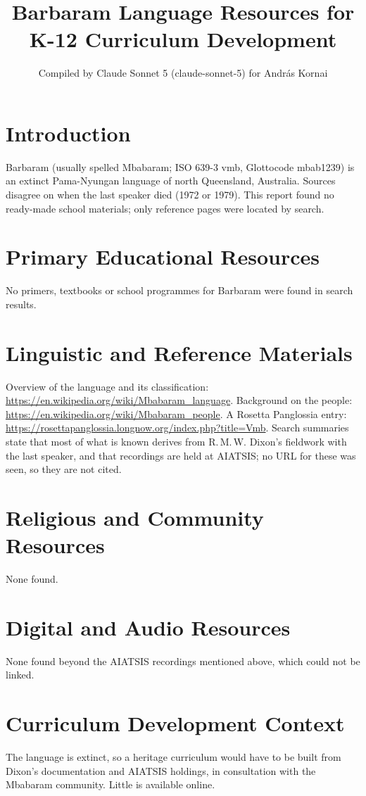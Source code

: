 \documentclass[12pt]{article}
\title{Barbaram Language Resources for K-12 Curriculum Development}
\author{Compiled by Claude Sonnet 5 (claude-sonnet-5) for Andr\'as Kornai}
\date{}
\begin{document}
\maketitle
\section{Introduction}
Barbaram (usually spelled Mbabaram; ISO 639-3 vmb, Glottocode mbab1239) is an extinct Pama-Nyungan language of north Queensland, Australia. Sources disagree on when the last speaker died (1972 or 1979). This report found no ready-made school materials; only reference pages were located by search.
\section{Primary Educational Resources}
No primers, textbooks or school programmes for Barbaram were found in search results.
\section{Linguistic and Reference Materials}
Overview of the language and its classification: \url{https://en.wikipedia.org/wiki/Mbabaram_language}. Background on the people: \url{https://en.wikipedia.org/wiki/Mbabaram_people}. A Rosetta Panglossia entry: \url{https://rosettapanglossia.longnow.org/index.php?title=Vmb}. Search summaries state that most of what is known derives from R.\,M.\,W. Dixon's fieldwork with the last speaker, and that recordings are held at AIATSIS; no URL for these was seen, so they are not cited.
\section{Religious and Community Resources}
None found.
\section{Digital and Audio Resources}
None found beyond the AIATSIS recordings mentioned above, which could not be linked.
\section{Curriculum Development Context}
The language is extinct, so a heritage curriculum would have to be built from Dixon's documentation and AIATSIS holdings, in consultation with the Mbabaram community. Little is available online.
\end{document}
